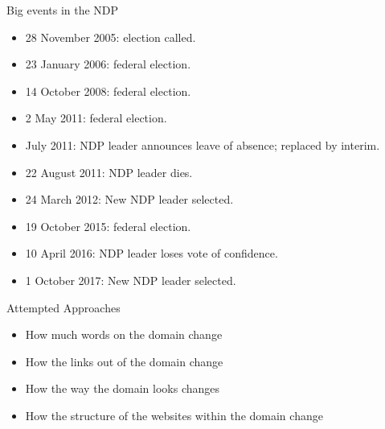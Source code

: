 \documentclass[10pt]{beamer}
\begin{document}
\begin{frame}{Big events in the NDP}

\begin{itemize}
\item 28 November 2005: election called.
\item 23 January 2006: federal election.
\item 14 October 2008: federal election.
\item 2 May 2011: federal election.
\item July 2011: NDP leader announces leave of absence; replaced by interim.
\item 22 August 2011: NDP leader dies.
\item 24 March 2012: New NDP leader selected.
\item 19 October 2015: federal election.
\item 10 April 2016: NDP leader loses vote of confidence.
\item 1 October 2017: New NDP leader selected.
\end{itemize}

\end{frame}

\begin{frame}{Attempted Approaches}
\Large
\begin{itemize}
\itemsep1.0em
\item How much words on the domain change
\item How the links out of the domain change
\item How the way the domain looks changes
\item How the structure of the websites within the domain change
\end{itemize}
\end{frame}
\end{document}
